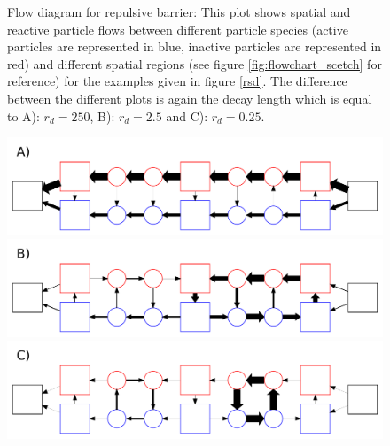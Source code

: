 \begin{minipage}[t]{.372 \textwidth}
    \vspace{0.5 cm}
    \begin{figure}[H]
        \caption{Flow diagram for repulsive barrier: This plot shows spatial and reactive particle flows between different particle species (active particles are represented in blue, inactive particles are represented in red) and different spatial regions (see figure \ref{fig:flowchart_scetch} for reference) for the examples given in figure \ref{rsd}. The difference between the different plots is again the decay length which is equal to \newline A): $r_d=250$, B): $r_d=2.5$ and \newline C): $r_d = 0.25$.
    \label{fig:flow_repulsive}}
    \end{figure}
\end{minipage}\hspace{0.02 \textwidth}\begin{minipage}[t]{.608 \textwidth}
    \begin{figure}[H]
        \includegraphics[width = 1 \textwidth]{plots/rep_flowchart0.pdf} 
        \includegraphics[width = 1 \textwidth]{plots/rep_flowchart1.pdf} 
        \includegraphics[width = 1 \textwidth]{plots/rep_flowchart2.pdf}
    \end{figure}
\end{minipage}
\vspace{0.5 cm} \\
